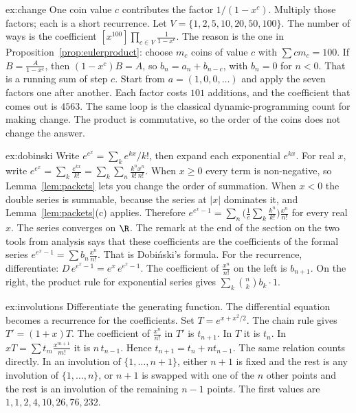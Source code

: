 \begin{solution}{ex:change}
\idea One coin value $c$ contributes the factor $1/(1-x^c)$. Multiply those factors; each is a short recurrence.
\writeup Let $V=\{1,2,5,10,20,50,100\}$. The number of ways is the coefficient $[x^{100}]\prod_{c\in V}\frac1{1-x^c}$. The reason is the one in
Proposition~\ref{prop:eulerproduct}: choose $m_c$ coins of value $c$ with $\sum cm_c=100$. If $B=\frac A{1-x^c}$, then
$(1-x^c)B=A$, so $b_n=a_n+b_{n-c}$, with $b_n=0$ for $n<0$. That is a running sum of step $c$. Start from
$a=(1,0,0,\dots)$ and apply the seven factors one after another. Each factor costs $101$ additions, and the coefficient that comes out is $4563$. The same loop is the classical
dynamic-programming count for making change. The product is commutative, so the order of the
coins does not change the answer.
\end{solution}

\begin{solution}{ex:dobinski}
\idea Write $e^{e^x}=\sum_k e^{kx}/k!$, then expand each exponential $e^{kx}$.
\writeup For real $x$, write $e^{e^x}=\sum_k\frac{e^{kx}}{k!}=\sum_k\sum_n\frac{k^nx^n}{k!\,n!}$. When $x\ge0$ every term is non-negative,
so Lemma~\ref{lem:packets} lets you change the order of summation. When $x<0$ the double series is summable, because the series at $|x|$ dominates it,
and Lemma~\ref{lem:packets}(c) applies. Therefore
$e^{e^x-1}=\sum_n\bigl(\frac1e\sum_k\frac{k^n}{k!}\bigr)\frac{x^n}{n!}$
for every real $x$. The series converges on $\R$. The remark at the end of the section on the two tools from analysis says that these coefficients are the coefficients of the
formal series $e^{e^x-1}=\sum b_n\frac{x^n}{n!}$. That is Dobi\'nski's formula. For the recurrence, differentiate:
$D\,e^{e^x-1}=e^x\,e^{e^x-1}$. The coefficient of $\frac{x^n}{n!}$ on the left is $b_{n+1}$. On the right, the product rule for exponential series gives
$\sum_k\binom nkb_k\cdot1$.
\end{solution}

\begin{solution}{ex:involutions}
\idea Differentiate the generating function. The differential equation becomes a recurrence for the coefficients.
\writeup Set $T=e^{x+x^2/2}$. The chain rule gives $T'=(1+x)T$. The coefficient of $\frac{x^n}{n!}$ in $T'$ is $t_{n+1}$. In $T$ it
is $t_n$. In $xT=\sum t_m\frac{x^{m+1}}{m!}$ it is $n\,t_{n-1}$. Hence $t_{n+1}=t_n+nt_{n-1}$. The same relation counts directly. In an involution of
$\{1,\dots,n+1\}$, either $n+1$ is fixed and the rest is any involution of $\{1,\dots,n\}$, or $n+1$ is swapped with one of
the $n$ other points and the rest is an involution of the remaining $n-1$ points. The first values are $1,1,2,4,10,26,76,232$.
\end{solution}

